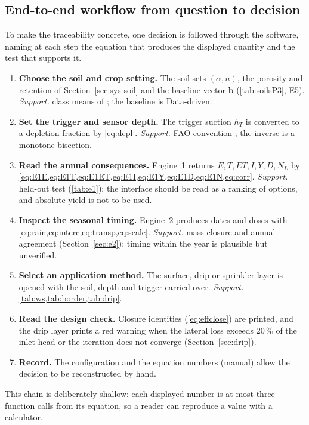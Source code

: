 \documentclass[preprint,12pt]{elsarticle}
\begin{document}
\subsection{End-to-end workflow from question to decision}
\label{sec:workflow}
To make the traceability concrete, one decision is followed through the software, naming at each step the equation that produces the displayed quantity and the test that supports it.
\begin{enumerate}[label=\textbf{Step \arabic*.}]
\item \textbf{Choose the soil and crop setting.} The soil sets $(\alpha,n)$, the porosity and retention of Section~\ref{sec:sys-soil} and the baseline vector $\mathbf b$ (\cref{tab:soilsP3}, E5). \emph{Support.} class means of \cite{Carsel1988}; the baseline is Data-driven.
\item \textbf{Set the trigger and sensor depth.} The trigger suction $h_T$ is converted to a depletion fraction by \cref{eq:depl}. \emph{Support.} FAO convention \cite{Allen1998}; the inverse is a monotone bisection.
\item \textbf{Read the annual consequences.} Engine~1 returns $E,T,\mathit{ET},I,Y,D,N_L$ by \cref{eq:E1E,eq:E1T,eq:E1ET,eq:E1I,eq:E1Y,eq:E1D,eq:E1N,eq:corr}. \emph{Support.} held-out test (\cref{tab:e1}); the interface should be read as a ranking of options, and absolute yield is not to be used.
\item \textbf{Inspect the seasonal timing.} Engine~2 produces dates and doses with \cref{eq:rain,eq:interc,eq:transp,eq:scale}. \emph{Support.} mass closure and annual agreement (Section~\ref{sec:e2}); timing within the year is plausible but unverified.
\item \textbf{Select an application method.} The surface, drip or sprinkler layer is opened with the soil, depth and trigger carried over. \emph{Support.} \cref{tab:ws,tab:border,tab:drip}.
\item \textbf{Read the design check.} Closure identities (\cref{eq:effclose}) are printed, and the drip layer prints a red warning when the lateral loss exceeds 20\,\% of the inlet head or the iteration does not converge (Section~\ref{sec:drip}).
\item \textbf{Record.} The configuration and the equation numbers (manual) allow the decision to be reconstructed by hand.
\end{enumerate}
This chain is deliberately shallow: each displayed number is at most three function calls from its equation, so a reader can reproduce a value with a calculator.
\end{document}

